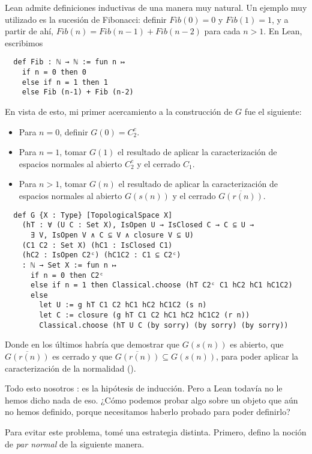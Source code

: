 Lean admite definiciones inductivas de una manera muy natural. Un ejemplo muy utilizado es la sucesión de Fibonacci: definir $Fib(0) = 0$ y $Fib(1) = 1$, y a partir de ahí, $Fib(n) = Fib(n-1)+Fib(n-2)$ para cada $n > 1$. En Lean, escribimos

\begin{lstlisting}
  def Fib : ℕ → ℕ := fun n ↦
    if n = 0 then 0
    else if n = 1 then 1
    else Fib (n-1) + Fib (n-2)
\end{lstlisting}

En vista de esto, mi primer acercamiento a la construcción de $G$ fue el siguiente:

\begin{itemize}
  \item Para $n = 0$, definir $G(0) = C_2^c$.
  \item Para $n = 1$, tomar $G(1)$ el resultado de aplicar la caracterización de espacios normales al abierto $C_2^c$ y el cerrado $C_1$.
  \item Para $n >1$, tomar $G(n)$ el resultado de aplicar la caracterización de espacios normales al abierto $G(s(n))$ y el cerrado $\overline{G(r(n))}$.
\end{itemize}

\newpage %

\begin{lstlisting}
  def G {X : Type} [TopologicalSpace X]
    (hT : ∀ (U C : Set X), IsOpen U → IsClosed C → C ⊆ U →
      ∃ V, IsOpen V ∧ C ⊆ V ∧ closure V ⊆ U)
    (C1 C2 : Set X) (hC1 : IsClosed C1)
    (hC2 : IsOpen C2ᶜ) (hC1C2 : C1 ⊆ C2ᶜ)
    : ℕ → Set X := fun n ↦
      if n = 0 then C2ᶜ
      else if n = 1 then Classical.choose (hT C2ᶜ C1 hC2 hC1 hC1C2)
      else
        let U := g hT C1 C2 hC1 hC2 hC1C2 (s n)
        let C := closure (g hT C1 C2 hC1 hC2 hC1C2 (r n))
        Classical.choose (hT U C (by sorry) (by sorry) (by sorry))
\end{lstlisting}

Donde en los últimos  habría que demostrar que $G(s(n))$ es abierto, que $\overline{G(r(n))}$ es cerrado y que $\overline{G(r(n))} \subseteq G(s(n))$, para poder aplicar la caracterización de la normalidad ().

Todo esto nosotros : es la hipótesis de inducción. Pero a Lean todavía no le hemos dicho nada de eso. ¿Cómo podemos probar algo sobre un objeto que aún no hemos definido, porque necesitamos haberlo probado para poder definirlo?

Para evitar este problema, tomé una estrategia distinta. Primero, defino la noción de \textit{par normal} de la siguiente manera.

